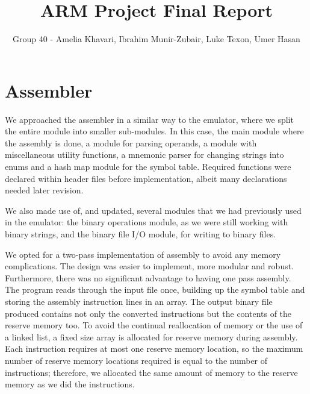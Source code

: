 \documentclass[11pt]{article}
\begin{document}
\title{ARM Project Final Report}
\author{Group 40 - Amelia Khavari, Ibrahim Munir-Zubair, Luke Texon, Umer Hasan}

\maketitle

\section{Assembler}
We approached the assembler in a similar way to the emulator, where we split the entire module into smaller sub-modules. In this case, the main module where the assembly is done, 
a module for parsing operands, a module with miscellaneous utility functions, 
a mnemonic parser for changing strings into enums and a hash map module for the symbol table. Required functions were declared within header files before implementation, albeit many declarations needed later revision.

We also made use of, and updated, several modules that we had previously used in the emulator: 
the binary operations module, as we were still working with binary strings, 
and the binary file I/O module, for writing to binary files.     

We opted for a two-pass implementation of assembly to avoid any memory complications. The design was easier to implement, more modular and robust. Furthermore, there was no significant advantage to having one pass assembly. 
The program reads through the input file once, building up the symbol table and storing the assembly instruction lines in an array. The output binary file produced contains not only the converted instructions but the contents of the reserve memory too. To avoid the continual reallocation of memory or the use of a linked list, a fixed size array is allocated for reserve memory during assembly. Each instruction requires at most one reserve memory location, so the maximum number of reserve memory locations required is equal to the number of instructions; therefore, we allocated the same amount of memory to the reserve memory as we did the instructions.
\end{document}
